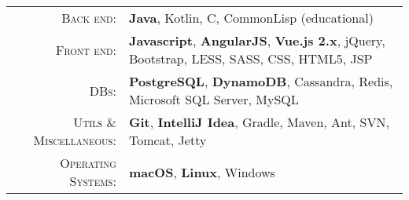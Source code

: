 %
%
%

\renewcommand{\arraystretch}{1.1}

	\begin{tabular}{>{}r>{}p{13cm}} 
		\textsc{Back end:} &
			\textbf{Java}, Kotlin, C, CommonLisp (educational) \\
		\textsc{Front end:} &
			\textbf{Javascript}, \textbf{AngularJS}, \textbf{Vue.js 2.x}, jQuery, Bootstrap, LESS, SASS, CSS, HTML5, JSP \\ 
		\textsc{DBs:} & 
			\textbf{PostgreSQL}, \textbf{DynamoDB}, Cassandra, Redis, Microsoft SQL Server, MySQL \\ 
		\textsc{Utils \& Miscellaneous:} &
			\textbf{Git}, \textbf{IntelliJ Idea}, Gradle, Maven, Ant, SVN, Tomcat, Jetty \\
		\textsc{Operating Systems:} &
			\textbf{macOS}, \textbf{Linux}, Windows \\ 
	\end{tabular}
